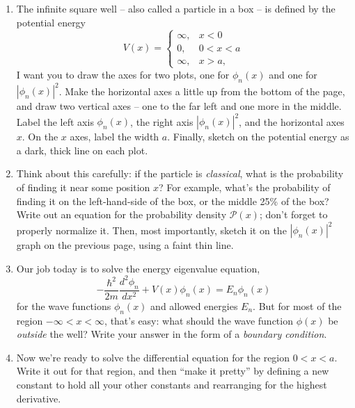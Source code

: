 \documentclass[10pt, letterpaper, twoside, openany]{article}
\newcounter{example}[section]
\begin{document}
\begin{enumerate}

\item The infinite square well -- also called a particle in a box -- is defined by the potential energy
\[
V(x) = 
\begin{cases} 
\infty, &  x < 0 \\
0, & 0 < x < a \\
\infty, & x>a,
\end{cases}
\]
I want you to draw the axes for two plots, one for $\phi_n(x)$ and one for $|\phi_n(x)|^2$.  Make the horizontal axes a little up from the bottom of the page, and draw two vertical axes -- one to the far left and one more in the middle.  Label the left axis $\phi_n(x)$, the right axis $|\phi_n(x)|^2$, and the horizontal axes $x$.  On the $x$ axes, label the width $a$.  Finally, sketch on the potential energy as a dark, thick line on each plot.

\newpage

\item Think about this carefully: if the particle is \emph{classical}, what is the probability of finding it near some position $x$?  For example, what's the probability of finding it on the left-hand-side of the box, or the middle 25\% of the box?  Write out an equation for the probability density $\mathcal{P}(x)$; don't forget to properly normalize it.  Then, most importantly, sketch it on the $|\phi_n(x)|^2$ graph on the previous page, using a faint thin line.

\vspace{2in}

\item Our job today is to solve the energy eigenvalue equation, 
\[
-\frac{\hbar^2}{2m} \frac{d^2 \phi_n}{dx^2} + V(x)\phi_n(x) = E_n \phi_n(x)
\]
for the wave functions $\phi_n(x)$ and allowed energies $E_n$.  But for most of the region $-\infty < x < \infty$, that's easy:  what should the wave function $\phi(x)$ be \emph{outside} the well?  Write your answer in the form of a \emph{boundary condition}.

\vspace{2in}

\item Now we're ready to solve the differential equation for the region $0<x<a$.  Write it out for that region, and then ``make it pretty'' by defining a new constant to hold all your other constants and rearranging for the highest derivative.

\newpage


\end{enumerate}
\end{document}
